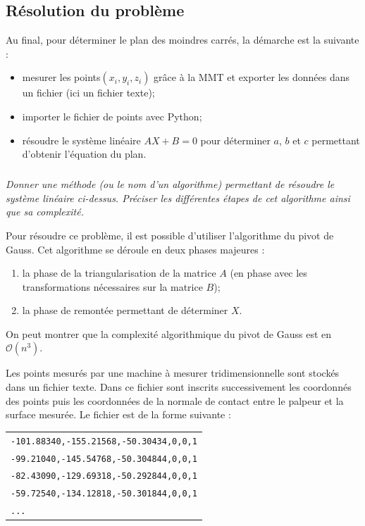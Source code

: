 \documentclass[10pt,fleqn]{article} %
\begin{document}
\else
\fi


\subsection{Résolution du problème}
\ifprof
\else
\begin{methode}
Au final, pour déterminer le plan des moindres carrés, la démarche est la suivante :
\begin{itemize}
\item mesurer les points$(x_i,y_i,z_i)$ grâce à la MMT et exporter les données dans un fichier (ici un fichier texte);
\item importer le fichier de points avec Python;
\item résoudre le système linéaire $AX+B=0$ pour déterminer $a$, $b$ et $c$ permettant d'obtenir l'équation du plan. 
\end{itemize}
\end{methode}
\fi

\subparagraph{}
\textit{Donner une méthode (ou le nom d'un algorithme) permettant de résoudre le système linéaire ci-dessus. Préciser les différentes étapes de cet algorithme ainsi que sa complexité.}


\ifprof
\begin{corrige}
Pour résoudre ce problème, il est possible d'utiliser l'algorithme du pivot de Gauss. Cet algorithme se déroule en deux phases majeures : 
\begin{enumerate}
\item la phase de la triangularisation de la matrice $A$ (en phase avec les transformations nécessaires sur la matrice $B$);
\item la phase de remontée permettant de déterminer $X$. 
\end{enumerate}

On peut montrer que la complexité algorithmique du pivot de Gauss est en $\mathcal{O}\left(n^3\right)$.
\end{corrige}
\else
\fi
\ifprof
\else
\vspace{.5cm}

Les points mesurés par une machine à mesurer tridimensionnelle sont stockés dans un fichier texte. Dans ce fichier sont inscrits successivement les coordonnés des points puis les coordonnées de la normale de contact entre le palpeur et la surface mesurée. Le fichier est de la forme suivante : 

\begin{tabular}{l}
\texttt{-101.88340,-155.21568,-50.30434,0,0,1}\\
\texttt{-99.21040,-145.54768,-50.304844,0,0,1}\\
\texttt{-82.43090,-129.69318,-50.292844,0,0,1}\\
\texttt{-59.72540,-134.12818,-50.301844,0,0,1}\\
\texttt{...} \\
\end{tabular}
\end{document}
